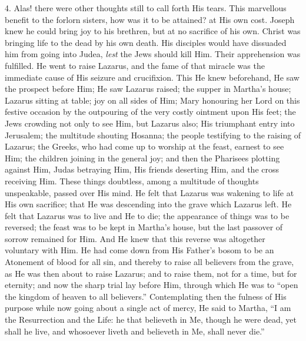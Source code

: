 4. Alas! there were other thoughts still to call forth His tears.
This marvellous benefit to the forlorn sisters, how was it to be
attained? at His own cost. Joseph knew he could bring joy to his
brethren, but at no sacrifice of his own. Christ was bringing life to
the dead by his own death. His disciples would have dissuaded him from
going into Judea, \emph{lest} the Jews should kill Him. Their
apprehension was fulfilled. He went to raise Lazarus, and the fame of
that miracle was the immediate cause of His seizure and crucifixion.
This He knew beforehand, He saw the prospect before Him; He saw
Lazarus raised; the supper in Martha's house; Lazarus sitting at
table; joy on all sides of Him; Mary honouring her Lord on this
festive occasion by the outpouring of the very costly ointment upon
His feet; the Jews crowding not only to see Him, but Lazarus also; His
triumphant entry into Jerusalem; the multitude shouting Hosanna; the
people testifying to the raising of Lazarus; the Greeks, who had come
up to worship at the feast, earnest to see Him; the children joining
in the general joy; and then the Pharisees plotting against Him, Judas
betraying Him, His friends deserting Him, and the cross receiving Him.
These things doubtless, among a multitude of thoughts unspeakable,
passed over His mind. He felt that Lazarus was wakening to life at His
own sacrifice; that He was descending into the grave which Lazarus
left. He felt that Lazarus was to live and He to die; the appearance
of things was to be reversed; the feast was to be kept in Martha's
house, but the last passover of sorrow remained for Him. And He knew
that this reverse was altogether voluntary with Him. He had come down
from His Father's bosom to be an Atonement of blood for all sin, and
thereby to raise all believers from the grave, as He was then about to
raise Lazarus; and to raise them, not for a time, but for eternity;
and now the sharp trial lay before Him, through which He was to
``open the kingdom of heaven to all believers.'' Contemplating
then the fulness of His purpose while now going about a single act of
mercy, He said to Martha, ``I am the Resurrection and the Life: he
that believeth in Me, though he were dead, yet shall he live, and
whosoever liveth and believeth in Me, shall never die.''

